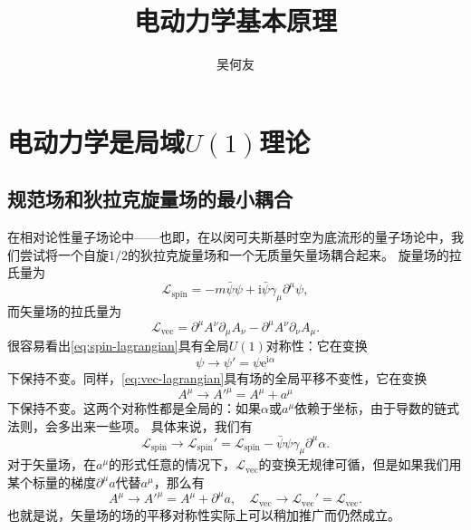 \documentclass[UTF8, a4paper]{ctexart}
\title{电动力学基本原理}
\author{吴何友}
\newcommand*{\ee}{\mathrm{e}}
\newcommand*{\ii}{\mathrm{i}}
\begin{document}
\maketitle

\section{电动力学是局域$U(1)$理论}

\subsection{规范场和狄拉克旋量场的最小耦合}

在相对论性量子场论中——也即，在以闵可夫斯基时空为底流形的量子场论中，我们尝试将一个自旋$1/2$的狄拉克旋量场和一个无质量矢量场耦合起来。
旋量场的拉氏量为
\begin{equation}
    \mathcal{L}_\text{spin} = - m \bar{\psi} \psi + \ii \bar{\psi} \gamma_\mu \partial^\mu \psi,
    \label{eq:spin-lagrangian}
\end{equation}
而矢量场的拉氏量为
\begin{equation}
    \mathcal{L}_\text{vec} = \partial^\mu A^\nu \partial_\mu A_\nu - \partial^\mu A^\nu \partial_\nu A_\mu.
    \label{eq:vec-lagrangian}
\end{equation}
很容易看出\eqref{eq:spin-lagrangian}具有全局$U(1)$对称性：它在变换
\[
    \psi \longrightarrow \psi' = \psi \ee^{\ii \alpha}
\]
下保持不变。同样，\eqref{eq:vec-lagrangian}具有场的全局平移不变性，它在变换
\[
    A^\mu \longrightarrow A'^\mu = A^\mu + a^\mu
\]
下保持不变。这两个对称性都是全局的：如果$\alpha$或$a^\mu$依赖于坐标，由于导数的链式法则，会多出来一些项。
具体来说，我们有
\[
    \mathcal{L}_\text{spin} \longrightarrow \mathcal{L}_\text{spin}' = \mathcal{L}_\text{spin} - \bar{\psi} \psi \gamma_\mu \partial^\mu \alpha.
\]
对于矢量场，在$a^\mu$的形式任意的情况下，$\mathcal{L}_\text{vec}$的变换无规律可循，但是如果我们用某个标量的梯度$\partial^\mu a$代替$a^\mu$，那么有
\[
    A^\mu \longrightarrow A'^\mu = A^\mu + \partial^\mu a, \quad
    \mathcal{L}_\text{vec} \longrightarrow \mathcal{L}_\text{vec}' = \mathcal{L}_\text{vec}.
\]
也就是说，矢量场的场的平移对称性实际上可以稍加推广而仍然成立。
\end{document}
